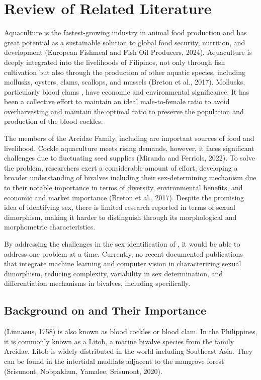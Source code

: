 \chapter{Review of Related Literature}
\label{sec:relatedlit}

Aquaculture is the fastest-growing industry in animal food production and has great potential as a sustainable solution to global food security, nutrition, and development (European Fishmeal and Fish Oil Producers, 2024). Aquaculture is deeply integrated into the livelihoods of Filipinos, not only through fish cultivation but also through the production of other aquatic species, including mollusks, oysters, clams, scallops, and mussels (Breton et al., 2017). Mollusks, particularly blood clams \Tegillarcagranosa, have economic and environmental significance. It has been a collective effort to maintain an ideal male-to-female ratio to avoid overharvesting and maintain the optimal ratio to preserve the population and production of the blood cockles. 
	
The members of the Arcidae Family, including \Tgranosa are important sources of food and livelihood. Cockle aquaculture meets rising demands, however, it faces significant challenges due to fluctuating seed supplies (Miranda and Ferriols, 2022). To solve the problem, researchers exert a considerable amount of effort, developing a broader understanding of bivalves including their sex-determining mechanism due to their notable importance in terms of diversity, environmental benefits, and economic and market importance (Breton et al., 2017). Despite the promising idea of identifying sex, there is limited research reported in terms of sexual dimorphism, making it harder to distinguish through its morphological and morphometric characteristics. 

By addressing the challenges in the sex identification of \Tgranosa, it would be able to address one problem at a time. Currently, no recent documented publications that integrate machine learning and computer vision in characterizing sexual dimorphism, reducing complexity, variability in sex determination, and differentiation mechanisms in bivalves, including \Tgranosa specifically.

\section{Background on \textit{\Tegillarcagranosa} and Their Importance}
\textit{\Tegillarcagranosa}(Linnaeus, 1758) is also known as blood cockles or blood clam. In the Philippines, it is commonly known as a Litob, a marine bivalve species from the family Arcidae. Litob is widely distributed in the world including Southeast Asia. They can be found in the intertidal mudflats adjacent to the mangrove forest (Srisunont, Nobpakhun, Yamalee, Srisunont, 2020).

